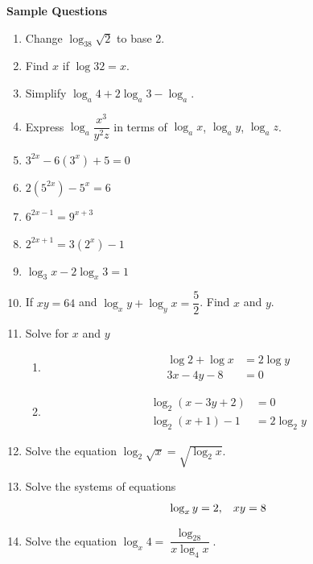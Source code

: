 \documentclass[11pt,a4paper]{article}
\begin{document}
\vspace{1cm}

\textbf{Sample Questions}
\begin{enumerate}
\item Change $\log_38\sqrt{2}$ to base 2.

\item Find $x$ if $\log 32=x$.

\item Simplify $\log_a4+2\log_a3-\log_a$.

\item Express $\log_a\dfrac{x^3}{y^2z}$ in terms of $\log_ax$, $\log_ay$, $\log_az$.

\item $3^{2x}-6(3^x)+5=0$

\item $2(5^{2x})-5^x=6$

\item $6^{2x-1}=9^{x+3}$

\item $2^{2x+1}=3(2^x)-1$

\item $\log_3x-2\log_x3=1$

\item If $xy=64$ and $\log_xy+\log_yx=\dfrac{5}{2}$. Find $x$ and $y$.

\item Solve for $x$ and $y$
\begin{enumerate}
     \item 
\begin{align*}
\log 2+\log x & = 2\log y\\
3x-4y-8 & = 0
\end{align*}

     \item 
\begin{align*}
\log_2(x-3y+2) & =0\\
\log_2(x+1)-1 & = 2\log_2y
\end{align*}
\end{enumerate}

\item Solve the equation $\log_2\sqrt{x}=\sqrt{\log_2x}$.

\item Solve the systems of equations $$\log_xy=2,\hspace{0.3cm} xy=8$$

\item Solve the equation $\log_x4=\dfrac{\log_28}{x\log_4x}$.


\end{enumerate}
\end{document}
